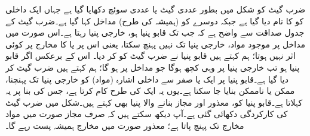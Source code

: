 ضرب گیٹ کو شکل  میں بطور عددی گیٹ یا عددی سوئچ دکھایا گیا ہے جہاں ایک داخلی  کو   کا نام دیا گیا ہے جبکہ دوسرے کو (ہمیشہ کی طرح) مداخل کہا گیا ہے۔ضرب گیٹ کے جدول صداقت  سے واضح ہے کہ جب تک قابو پنیا  ہو، خارجی پنیا  رہتا ہے۔اس صورت میں مداخل پر موجود مواد، خارجی پنیا تک نہیں پہنچ سکتا، یعنی اس پر  یا  کا مخارج پر کوئی اثر نہیں ہوتا؛ ہم کہتے ہیں قابو پنیا نے ضرب گیٹ کو  کر دیا۔ اس کے برعکس اگر قابو پنیا  ہو تب خارجی پنیا پر وہی کچھ ہوگا جو مداخل پر ہو گا؛ ہم کہتے ہیں ضرب گیٹ   کر دیا گیا ہے۔قابو پنیا پر ایک یا صفر سے داخلی اشارہ (مواد) کو خارجی پنیا تک پہنچنا، ممکن یا ناممکن بنایا جا سکتا ہے۔یوں یہ ایک   کی طرح کام کرتا ہے، جس کی بنا پر یہ   کہلاتا ہے۔قابو پنیا کو، معذور اور مجاز بنانے والا پنیا بھی کہتے ہیں۔شکل  میں ضرب گیٹ کی کارکردگی دکھائی گئی ہے۔آپ دیکھ سکتے ہیں کہ صرف مجاز صورت میں مواد مخارج تک پہنچ پاتا ہے؛ معذور صورت میں مخارج ہمیشہ پست رہے گا۔


